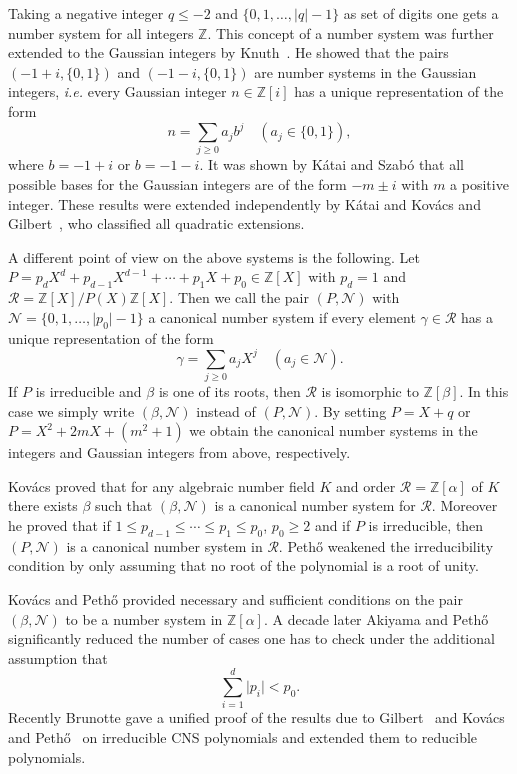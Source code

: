 \documentclass{amsart}
\theoremstyle{plain}
\numberwithin{equation}{section}
\theoremstyle{remark}
\begin{document}
Taking a negative integer $q\leq-2$ and $\{0,1,\ldots,\lvert
q\rvert-1\}$ as set of digits one gets a number system for all
integers ${{\mathbb Z}}$.  This concept of a number system was further extended
to the Gaussian integers by
Knuth~\cite{knuth1981:art_computer_programming}. He showed that the
pairs $(-1+i,\{0,1\})$ and $(-1-i,\{0,1\})$ are number systems in the
Gaussian integers, \textit{i.e.} every Gaussian integer $n\in{{\mathbb Z}}[i]$
has a unique representation of the form
$$n=\sum_{j\geq0}a_jb^j\quad(a_j\in\{0,1\}),$$
where $b=-1+i$ or $b=-1-i$. It was shown by K{\'a}tai and Szab{\'o}
\cite{katai_szabo1975:canonical_number_systems} that all possible
bases for the Gaussian integers are of the form $-m\pm i$ with $m$ a positive
integer. These results were extended independently by K\'atai and
Kov\'acs \cite{katai_kovacs1981:canonical_number_systems,
  katai_kovacs1980:kanonische_zahlensysteme_in} and
Gilbert~\cite{gilbert81:_radix}, who classified all quadratic
extensions.

A different point of view on the above systems is the following. Let
$P=p_dX^d+p_{d-1}X^{d-1}+\cdots+p_1X+p_0\in{{\mathbb Z}}[X]$ with $p_d=1$ and
$\mathcal{R}={{\mathbb Z}}[X]/P(X){{\mathbb Z}}[X]$. Then we call the pair $(P,\mathcal{N})$
with $\mathcal{N}=\{0,1,\ldots,\lvert p_0\rvert-1\}$ a canonical
number system if every element $\gamma\in\mathcal{R}$ has a unique
representation of the form
\[\gamma=\sum_{j\geq0}a_jX^j\quad(a_j\in\mathcal{N}).\]
If $P$ is irreducible and $\beta$ is one of its roots, then
$\mathcal{R}$ is isomorphic to ${{\mathbb Z}}[\beta]$. In this case we simply
write $(\beta,\mathcal{N})$ instead of $(P,\mathcal{N})$. By setting
$P=X+q$ or $P=X^2+2mX+(m^2+1)$ we obtain the canonical number systems
in the integers and Gaussian integers from above, respectively.

Kov\'acs \cite{kovacs1981:canonical_number_systems} proved that for
any algebraic number field $K$ and order $\mathcal R={{\mathbb Z}}[\alpha]$ of
$K$ there exists $\beta$ such that $(\beta,\mathcal{N})$ is a
canonical number system for $\mathcal R$. Moreover he proved that if
$1\leq p_{d-1}\leq \cdots\leq p_1\leq p_0$, $p_0\geq2$ and if $P$ is
irreducible, then $(P,\mathcal{N})$ is a canonical number system in
$\mathcal{R}$. Peth{\H o}
\cite{pethoe1991:polynomial_transformation_and} weakened the
irreducibility condition by only assuming that no root of the
polynomial is a root of unity.

Kov\'acs and Peth{\H o} \cite{kovacs_petho1991:number_systems_in}
provided necessary and sufficient conditions on the pair
$(\beta,\mathcal{N})$ to be a number system in ${{\mathbb Z}}[\alpha]$. A decade
later Akiyama 
and Peth{\H o} \cite{akiyama_petho2002:canonical_number_systems}
significantly reduced the number of cases one has to check under the
additional assumption that
$$\sum_{i=1}^d\lvert p_i\rvert<p_0.$$
Recently Brunotte \cite{Brunotte:2012} gave a unified proof of the 
results due to Gilbert~\cite{gilbert81:_radix} and Kov\'acs and
Peth{\H o}~\cite{kovacs_petho1991:number_systems_in} on irreducible CNS polynomials
and extended them to reducible polynomials.
\end{document}
